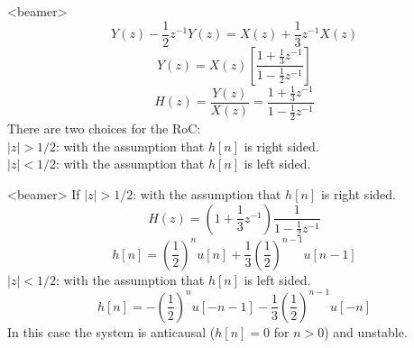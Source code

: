 \begin{frame}<beamer>
    \begin{equation*}
        Y(z) - \frac{1}{2} z^{-1}Y(z) = X(z) + \frac{1}{3} z^{-1}X(z)
    \end{equation*}
    \pause
    \begin{equation*}
        Y(z)  = X(z)\left[\frac{1+\frac{1}{3} z^{-1}}{1 - \frac{1}{2} z^{-1}}\right]
    \end{equation*}
    \pause
    \begin{equation*}
        H(z)  = \frac{Y(z)}{X(z)} = \frac{1+\frac{1}{3} z^{-1}}{1 - \frac{1}{2} z^{-1}}
    \end{equation*}
    There are two choices for the RoC:\\
    $|z| > 1/2$: with the assumption that $h[n]$ is right sided.\\
    $|z| < 1/2$: with the assumption that $h[n]$ is left sided.\\
\end{frame}

\begin{frame}<beamer>
    If $|z| > 1/2$: with the assumption that $h[n]$ is right sided.\\
    \begin{equation*}
        H(z) = \left(1+\frac{1}{3} z^{-1}\right)\frac{1}{1 - \frac{1}{2} z^{-1}}
    \end{equation*}
    \pause
     \begin{equation*}
        h[n] = \left( \frac{1}{2}\right)^nu[n] + \frac{1}{3}\left( \frac{1}{2}\right)^{n-1}u[n-1]
     \end{equation*}
     \pause
    $|z| < 1/2$: with the assumption that $h[n]$ is left sided.\\
     \begin{equation*}
        h[n] = -\left( \frac{1}{2}\right)^nu[-n-1] - \frac{1}{3}\left( \frac{1}{2}\right)^{n-1}u[-n]
     \end{equation*}
     In this case the system is anticausal ($h[n] =0$ for $n>0$) and unstable.
\end{frame} 